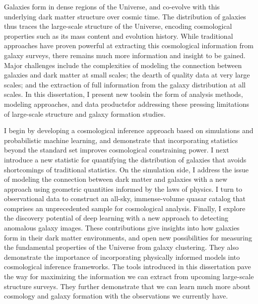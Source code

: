 Galaxies form in dense regions of the Universe, and co-evolve with this underlying dark matter structure over cosmic time.
The distribution of galaxies thus traces the large-scale structure of the Universe, encoding cosmological properties such as its mass content and evolution history.
While traditional approaches have proven powerful at extracting this cosmological information from galaxy surveys, there remains much more information and insight to be gained.
Major challenges include the complexities of modeling the connection between galaxies and dark matter at small scales; the dearth of quality data at very large scales; and the extraction of full information from the galaxy distribution at all scales.
In this dissertation, I present new tools{\emdash}in the form of analysis methods, modeling approaches, and data products{\emdash}for addressing these pressing limitations of large-scale structure and galaxy formation studies.

I begin by developing a cosmological inference approach based on simulations and probabilistic machine learning, and demonstrate that incorporating statistics beyond the standard set improves cosmological constraining power.
I next introduce a new statistic for quantifying the distribution of galaxies that avoids shortcomings of traditional statistics.
On the simulation side, I address the issue of modeling the connection between dark matter and galaxies with a new approach using geometric quantities informed by the laws of physics.
I turn to observational data to construct an all-sky, immense-volume quasar catalog that comprises an unprecedented sample for cosmological analysis.
Finally, I explore the discovery potential of deep learning with a new approach to detecting anomalous galaxy images.
These contributions give insights into how galaxies form in their dark matter environments, and open new possibilities for measuring the fundamental properties of the Universe from galaxy clustering.
They also demonstrate the importance of incorporating physically informed models into cosmological inference frameworks.
The tools introduced in this dissertation pave the way for maximizing the information we can extract from upcoming large-scale structure surveys.
They further demonstrate that we can learn much more about cosmology and galaxy formation with the observations we currently have.